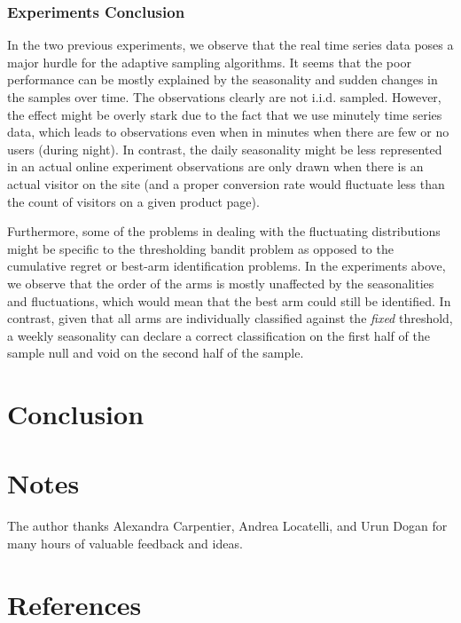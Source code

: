 \documentclass[11pt,]{article}
\begin{document}
\subsubsection{Experiments Conclusion}\label{experiments-conclusion}

In the two previous experiments, we observe that the real time series
data poses a major hurdle for the adaptive sampling algorithms. It seems
that the poor performance can be mostly explained by the seasonality and
sudden changes in the samples over time. The observations clearly are
not i.i.d. sampled. However, the effect might be overly stark due to the
fact that we use minutely time series data, which leads to observations
even when in minutes when there are few or no users (during night). In
contrast, the daily seasonality might be less represented in an actual
online experiment observations are only drawn when there is an actual
visitor on the site (and a proper conversion rate would fluctuate less
than the count of visitors on a given product page).

Furthermore, some of the problems in dealing with the fluctuating
distributions might be specific to the thresholding bandit problem as
opposed to the cumulative regret or best-arm identification problems. In
the experiments above, we observe that the order of the arms is mostly
unaffected by the seasonalities and fluctuations, which would mean that
the best arm could still be identified. In contrast, given that all arms
are individually classified against the \emph{fixed} threshold, a weekly
seasonality can declare a correct classification on the first half of
the sample null and void on the second half of the sample.

\section{Conclusion}\label{conclusion}

\section{Notes}\label{notes}

The author thanks Alexandra Carpentier, Andrea Locatelli, and Urun Dogan
for many hours of valuable feedback and ideas.

\section{References}\label{references}
\end{document}
